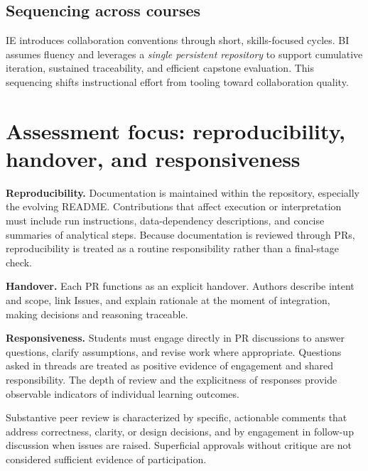 \subsection{Sequencing across courses}

IE introduces collaboration conventions through short, skills-focused cycles. BI assumes fluency and leverages a \emph{single persistent repository} to support cumulative iteration, sustained traceability, and efficient capstone evaluation. This sequencing shifts instructional effort from tooling toward collaboration quality.

\section{Assessment focus: reproducibility, handover, and responsiveness}

\textbf{Reproducibility.} Documentation is maintained within the repository, especially the evolving README. Contributions that affect execution or interpretation must include run instructions, data-dependency descriptions, and concise summaries of analytical steps. Because documentation is reviewed through PRs, reproducibility is treated as a routine responsibility rather than a final-stage check.

\textbf{Handover.} Each PR functions as an explicit handover. Authors describe intent and scope, link Issues, and explain rationale at the moment of integration, making decisions and reasoning traceable.

\textbf{Responsiveness.} Students must engage directly in PR discussions to answer questions, clarify assumptions, and revise work where appropriate. Questions asked in threads are treated as positive evidence of engagement and shared responsibility. 
The depth of review and the explicitness of responses provide observable indicators of individual learning outcomes.

Substantive peer review is characterized by specific, actionable comments that address correctness, clarity, or design decisions, and by engagement in follow-up discussion when issues are raised. Superficial approvals without critique are not considered sufficient evidence of participation.


